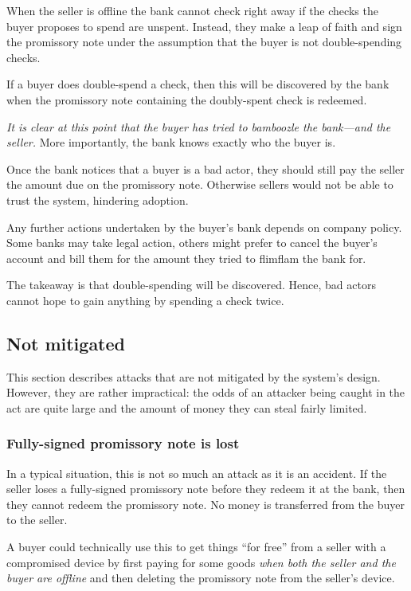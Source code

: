 \documentclass[12pt,a4paper]{article}
\begin{document}
\begin{multicols}{2}
	When the seller is offline the bank cannot check right away if the checks the buyer proposes to spend are unspent. Instead, they make a leap of faith and sign the promissory note under the assumption that the buyer is not double-spending checks.

	If a buyer does double-spend a check, then this will be discovered by the bank when the promissory note containing the doubly-spent check is redeemed.

	\emph{It is clear at this point that the buyer has tried to bamboozle the bank---and the seller.}  More importantly, the bank knows exactly who the buyer is.

	Once the bank notices that a buyer is a bad actor, they should still pay the seller the amount due on the promissory note. Otherwise sellers would not be able to trust the system, hindering adoption.
	
	Any further actions undertaken by the buyer's bank depends on company policy. Some banks may take legal action, others might prefer to cancel the buyer's account and bill them for the amount they tried to flimflam the bank for.

	The takeaway is that double-spending will be discovered. Hence, bad actors cannot hope to gain anything by spending a check twice.

	\subsection{Not mitigated}
	
	This section describes attacks that are not mitigated by the system's design. However, they are rather impractical: the odds of an attacker being caught in the act are quite large and the amount of money they can steal fairly limited.

	\subsubsection{Fully-signed promissory note is lost}
	\label{sec:signed-promissory-note-is-lost}

	In a typical situation, this is not so much an attack as it is an accident. If the seller loses a fully-signed promissory note before they redeem it at the bank, then they cannot redeem the promissory note. No money is transferred from the buyer to the seller.

	A buyer could technically use this to get things ``for free'' from a seller with a compromised device by first paying for some goods \emph{when both the seller and the buyer are offline} and then deleting the promissory note from the seller's device.


\end{multicols}
\end{document}
